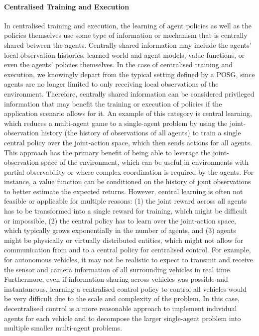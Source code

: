 \documentclass{article}
\begin{document}
\paragraph{Centralised Training and Execution}  In centralised training and execution, the learning of agent policies as well as the policies themselves use some type of information or mechanism that is centrally shared between the agents. Centrally shared information may include the agents’ local observation histories, learned world and agent models, value functions, or even the agents’ policies themselves. In the case of centralised training and execution, we knowingly depart from the typical setting defined by a POSG, since agents are no longer limited to only receiving local observations of the environment. Therefore, centrally shared information can be considered privileged information that may benefit the training or execution of policies if the application scenario allows for it. An example of this category is central learning, which reduces a multi-agent game to a single-agent problem by using the joint-observation history (the history of observations of all agents) to train a single central policy over the joint-action space, which then sends actions for all agents. This approach has the primary benefit of being able to leverage the joint-observation space of the environment, which can be useful in environments with partial observability or where complex coordination is required by the agents. For instance, a value function can be conditioned on the history of joint observations to better estimate the expected returns. However, central learning is often not feasible or applicable for multiple reasons: (1) the joint reward across all agents has to be transformed into a single reward for training, which might be difficult or impossible, (2) the central policy has to learn over the joint-action space, which typically grows exponentially in the number of agents, and (3) agents might be physically or virtually distributed entities, which might not allow for communication from and to a central policy for centralised control. For example, for autonomous vehicles, it may not be realistic to expect to transmit and receive the sensor and camera information of all surrounding vehicles in real time. Furthermore, even if information sharing across vehicles was possible and instantaneous, learning a centralised control policy to control all vehicles would be very difficult due to the scale and complexity of the problem. In this case, decentralised control is a more reasonable approach to implement individual agents for each vehicle and to decompose the larger single-agent problem into multiple smaller multi-agent problems. 
\end{document}
